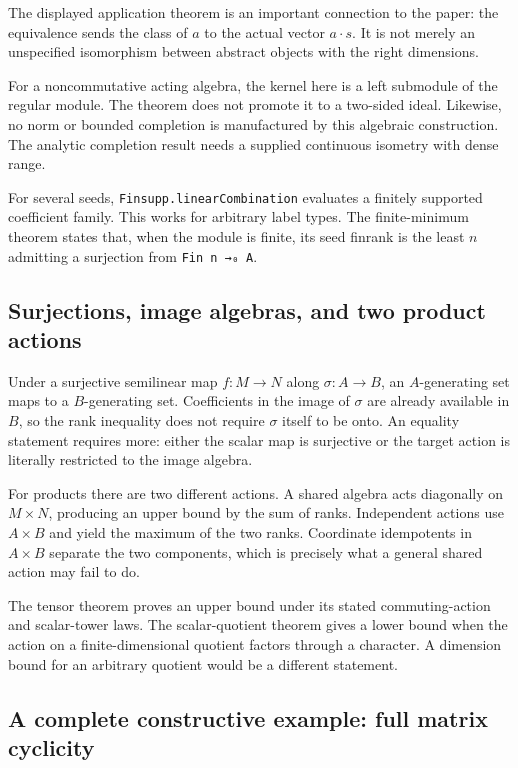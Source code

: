\documentclass[11pt,a4paper]{article}
\newcommand{\code}[1]{\nolinkurl{#1}}
\begin{document}
The displayed application theorem is an important connection to the paper: the equivalence sends the class of $a$ to the actual vector $a\cdot s$. It is not merely an unspecified isomorphism between abstract objects with the right dimensions.

For a noncommutative acting algebra, the kernel here is a left submodule of the regular module. The theorem does not promote it to a two-sided ideal. Likewise, no norm or bounded completion is manufactured by this algebraic construction. The analytic completion result needs a supplied continuous isometry with dense range.

For several seeds, \code{Finsupp.linearCombination} evaluates a finitely supported coefficient family. This works for arbitrary label types. The finite-minimum theorem states that, when the module is finite, its seed finrank is the least $n$ admitting a surjection from \code{Fin n →₀ A}.

\subsection{Surjections, image algebras, and two product actions}

Under a surjective semilinear map $f:M\to N$ along $\sigma:A\to B$, an $A$-generating set maps to a $B$-generating set. Coefficients in the image of $\sigma$ are already available in $B$, so the rank inequality does not require $\sigma$ itself to be onto. An equality statement requires more: either the scalar map is surjective or the target action is literally restricted to the image algebra.

For products there are two different actions. A shared algebra acts diagonally on $M\times N$, producing an upper bound by the sum of ranks. Independent actions use $A\times B$ and yield the maximum of the two ranks. Coordinate idempotents in $A\times B$ separate the two components, which is precisely what a general shared action may fail to do.

The tensor theorem proves an upper bound under its stated commuting-action and scalar-tower laws. The scalar-quotient theorem gives a lower bound when the action on a finite-dimensional quotient factors through a character. A dimension bound for an arbitrary quotient would be a different statement.

\subsection{A complete constructive example: full matrix cyclicity}
\end{document}
